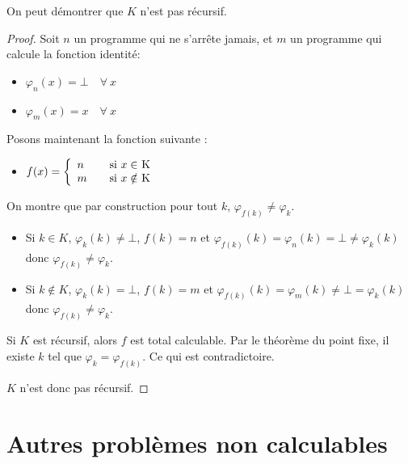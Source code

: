 \begin{myrem}
	On peut démontrer que $K$ n'est pas récursif.

    \begin{proof}
	Soit $n$ un programme qui ne s'arrête jamais, et $m$ un programme qui calcule la fonction identité: 
		\begin{itemize}
		\item $\varphi_n(x) = \bot \quad \forall \ x$
		\item $\varphi_m(x) = x \quad \forall  \ x$
	\end{itemize}
	Posons maintenant la  fonction suivante :
	\begin{itemize}

		\item $ f(x) = \left\{
		\begin{array}{l l}
			n & \quad \text{si $x\in$ K}\\
    		m & \quad \text{si $x\notin$ K}
		\end{array} \right.$
	\end{itemize}

    On montre que par construction pour tout $k$, $\varphi_{f(k)} \neq \varphi_k$.
    \begin{itemize}
      \item Si $k \in K$, $\varphi_k(k) \neq \bot$, $f(k) = n$ et
        $\varphi_{f(k)}(k) = \varphi_n(k) = \bot \neq \varphi_k(k)$ donc $\varphi_{f(k)} \neq \varphi_k$.
      \item Si $k \notin K$, $\varphi_k(k) = \bot$, $f(k) = m$ et
        $\varphi_{f(k)}(k) = \varphi_m(k) \neq \bot = \varphi_k(k)$ donc $\varphi_{f(k)} \neq \varphi_k$.
    \end{itemize}
    Si $K$ est récursif, alors $f$ est total calculable.
	Par le théorème du point fixe, il existe $k$ tel que $\varphi_k = \varphi_{f(k)}$.
    Ce qui est contradictoire.

    $K$ n'est donc pas récursif.
  \end{proof}
  
\end{myrem}

\section{Autres problèmes non calculables}
\label{sec:autres_probl_mes_non_calculable}

